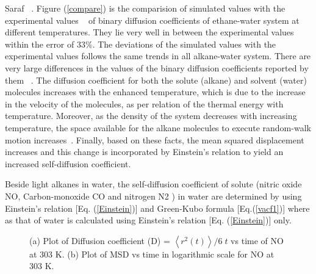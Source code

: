   Saraf~ \citep{witherspoon1965diffusion}. Figure (\ref{compare}) is the comparision of simulated values with the experimental values ~\citep{wise1966diffusion, witherspoon1965diffusion} of binary diffusion coefficients of ethane-water system at different temperatures. They lie very well in between the experimental values~ \citep{wise1966diffusion, witherspoon1965diffusion}  within the error of $33\%$. The deviations of the simulated values with the experimental values follows the same trends in all alkane-water system. There are very large differences in the values  of the binary diffusion coefficients reported by them ~\citep{wise1966diffusion, witherspoon1965diffusion}. The diffusion coefficient for both the solute (alkane) and solvent (water) molecules increases with the enhanced temperature, which is due to the increase in the velocity of the molecules, as per relation of the thermal energy with temperature. Moreover, as the density of the system decreases with increasing temperature, the space available for the alkane molecules to execute random-walk motion increases~\citep{Thapa2013}. Finally, based on these facts, the mean squared displacement increases and this change is incorporated by Einstein's relation to yield an increased self-diffusion coefficient.

Beside light alkanes in water,  the self-diffusion coefficient of  solute (nitric oxide  NO, Carbon-monoxide CO and nitrogen N2 ) in water  are  determined by using Einstein's relation [Eq. (\ref{Einstein})] and Green-Kubo formula  [Eq.(\ref{vacf1})]  where as that of water is calculated using Einstein's relation [Eq. (\ref{Einstein})] only. 

\begin{figure}[h!]
\begin{center}
\caption[Plot of  MSD vs time  in logarithmic scale and the  diffusion coefficient nitric oxide.] {(a) Plot of Diffusion coefficient (D) = $\left\langle r^2(t)\right\rangle / 6\;t$ vs time of NO at 303 K. (b) Plot of MSD vs time in logarithmic scale for NO at 303 K. }
\label{diffusionno}
\end{center}
\end{figure}

